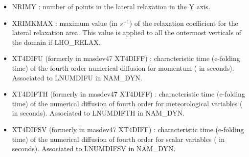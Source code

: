 \begin{itemize}
\item
{}
NRIMY : number of points in the lateral relaxation  in the Y axis.
\item
{}
XRIMKMAX : maximum value (in $s^{-1}$)  of the relaxation coefficient
for the lateral relaxation area. This value is applied to all the
outermost verticals of the domain if LHO\_RELAX. 

\item
{}
XT4DIFU (formerly in masdev47 XT4DIFF) : characteristic time (e-folding time)  
of the fourth order numerical diffusion for momentum ( in seconds). Associated to LNUMDIFU in NAM\_DYN.

\item
{}
XT4DIFTH (formerly in masdev47 XT4DIFF) : characteristic time (e-folding time)  of the numerical diffusion
of fourth order for meteorological variables ( in seconds). Associated to LNUMDIFTH in NAM\_DYN.

\item
{}
XT4DIFSV (formerly in masdev47 XT4DIFF) : characteristic time (e-folding time)  of the numerical diffusion
of fourth order for scalar variables ( in seconds). Associated to LNUMDIFSV in NAM\_DYN.

\end{itemize}
